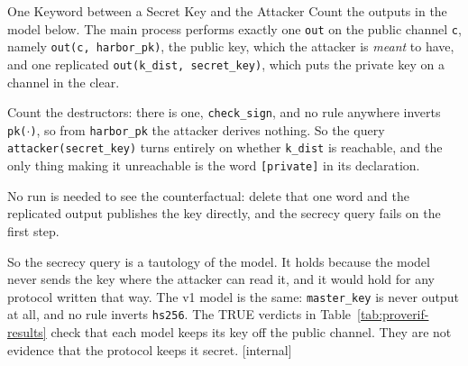 \documentclass[11pt,a4paper]{article}
\theoremstyle{definition}
\begin{document}
\begin{pdexample}{One Keyword between a Secret Key and the Attacker}
\setlength{\parskip}{4pt plus 1pt}
Count the outputs in the model below. The main process performs exactly one
\texttt{out} on the public channel \texttt{c}, namely \texttt{out(c, harbor\_pk)},
the public key, which the attacker is \emph{meant} to have, and one
replicated \texttt{out(k\_dist, secret\_key)}, which puts the private key on a
channel in the clear.

Count the destructors: there is one,
\texttt{check\_sign}, and no rule anywhere inverts \texttt{pk($\cdot$)}, so
from \texttt{harbor\_pk} the attacker derives nothing. So the query
\texttt{attacker(secret\_key)} turns entirely on whether \texttt{k\_dist} is
reachable, and the only thing making it unreachable is the word
\texttt{[private]} in its declaration.

No run is needed to see the
counterfactual: delete that one word and the replicated output publishes the
key directly, and the secrecy query fails on the first step.

So the secrecy query is a tautology of the model. It holds because the model
never sends the key where the attacker can read it, and it would hold for any
protocol written that way. The v1 model is the same: \texttt{master\_key} is
never output at all, and no rule inverts \texttt{hs256}. The TRUE verdicts in
Table~\ref{tab:proverif-results} check that each model keeps its key off the
public channel. They are not evidence that the protocol keeps it secret.
[internal]
\end{pdexample}
\end{document}
